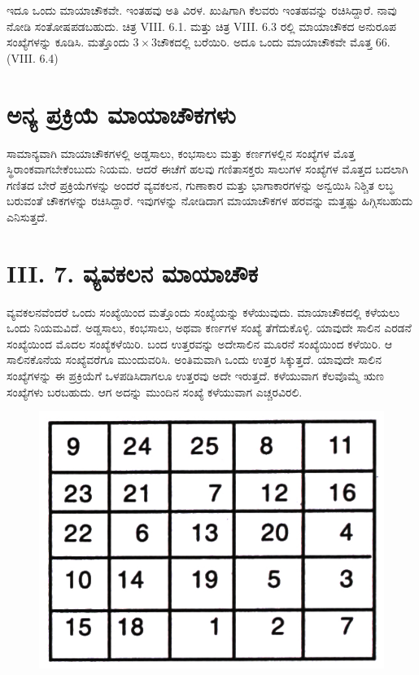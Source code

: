 ಇದೂ ಒಂದು ಮಾಯಾಚೌಕವೇ. ಇಂತಹವು ಅತಿ ವಿರಳ. ಖುಷಿಗಾಗಿ ಕೆಲವರು ಇಂತಹ\-ವನ್ನು ರಚಿಸಿದ್ದಾರೆ. ನಾವು ನೋಡಿ ಸಂತೋಷಪಡಬಹುದು. ಚಿತ್ರ VIII. 6.1. ಮತ್ತು ಚಿತ್ರ VIII. 6.3 ರಲ್ಲಿ ಮಾಯಾಚೌಕದ ಅನುರೂಪ ಸಂಖ್ಯೆಗಳನ್ನು ಕೂಡಿಸಿ. ಮತ್ತೊಂದು $3 \times 3$ಚೌಕದಲ್ಲಿ ಬರೆಯಿರಿ. ಅದೂ ಒಂದು ಮಾಯಾಚೌಕವೇ ಮೊತ್ತ 66. (VIII. 6.4)

\section*{ಅನ್ಯ ಪ್ರಕ್ರಿಯೆ ಮಾಯಾಚೌಕಗಳು}

ಸಾಮಾನ್ಯವಾಗಿ ಮಾಯಾಚೌಕಗಳಲ್ಲಿ ಅಡ್ಡಸಾಲು, ಕಂಭಸಾಲು ಮತ್ತು ಕರ್ಣಗಳಲ್ಲಿನ ಸಂಖ್ಯೆಗಳ ಮೊತ್ತ ಸ್ಥಿರಾಂಕವಾಗಬೇಕೆಂಬುದು ನಿಯಮ. ಆದರೆ ಈಚೆಗೆ ಹಲವು ಗಣಿತಾಸಕ್ತರು ಸಾಲು\-ಗಳ ಸಂಖ್ಯೆಗಳ ಮೊತ್ತದ ಬದಲಾಗಿ ಗಣಿತದ ಬೇರೆ ಪ್ರಕ್ರಿಯೆಗಳನ್ನು ಅಂದರೆ ವ್ಯವಕಲನ, ಗುಣಾ\-ಕಾರ ಮತ್ತು ಭಾಗಾಕಾರಗಳನ್ನು ಅನ್ವಯಿಸಿ ನಿಶ್ಚಿತ ಲಬ್ಧ ಬರುವಂತೆ ಚೌಕಗಳನ್ನು ರಚಿಸಿ\-ದ್ದಾರೆ. ಇವುಗಳನ್ನು ನೋಡಿದಾಗ ಮಾಯಾಚೌಕಗಳ ಹರವನ್ನು ಮತ್ತಷ್ಟು ಹಿಗ್ಗಿಸಬಹುದು \break ಎನಿಸುತ್ತದೆ.

\section*{ III. 7. ವ್ಯವಕಲನ ಮಾಯಾಚೌಕ}

ವ್ಯವಕಲನವೆಂದರೆ ಒಂದು ಸಂಖ್ಯೆಯಿಂದ ಮತ್ತೊಂದು ಸಂಖ್ಯೆಯನ್ನು ಕಳೆಯುವುದು. \hbox{ಮಾಯಾಚೌಕದಲ್ಲಿ} ಕಳೆಯಲು ಒಂದು ನಿಯಮವಿದೆ. ಅಡ್ಡಸಾಲು, ಕಂಭಸಾಲು, ಅಥವಾ ಕರ್ಣಗಳ ಸಂಖ್ಯೆ ತೆಗೆದುಕೊಳ್ಳಿ. ಯಾವುದೇ ಸಾಲಿನ ಎರಡನೆ ಸಂಖ್ಯೆಯಿಂದ ಮೊದಲ ಸಂಖ್ಯೆ\-ಕಳೆಯಿರಿ. ಬಂದ ಉತ್ತರವನ್ನು ಅದೇಸಾಲಿನ ಮೂರನೆ ಸಂಖ್ಯೆಯಿಂದ ಕಳೆಯಿರಿ. ಆ ಸಾಲಿನ\-ಕೊನೆಯ ಸಂಖ್ಯೆವರೆಗೂ ಮುಂದುವರಿಸಿ. ಅಂತಿಮವಾಗಿ ಒಂದು ಉತ್ತರ ಸಿಕ್ಕುತ್ತದೆ.  \break ಯಾವುದೇ ಸಾಲಿನ ಸಂಖ್ಯೆಗಳನ್ನು ಈ ಪ್ರಕ್ರಿಯೆಗೆ ಒಳಪಡಿಸಿದಾಗಲೂ ಉತ್ತರವು ಅದೇ ಇರುತ್ತದೆ. ಕಳೆಯುವಾಗ ಕೆಲವೊಮ್ಮೆ ಋಣ ಸಂಖ್ಯೆಗಳು ಬರಬಹುದು. ಆಗ ಅದನ್ನು ಮುಂದಿನ ಸಂಖ್ಯೆ ಕಳೆಯುವಾಗ ಎಚ್ಚರವಿರಲಿ.
\begin{figure}[H]
\includegraphics{src/figures/chap7/fig7-24.jpg}
\end{figure}


